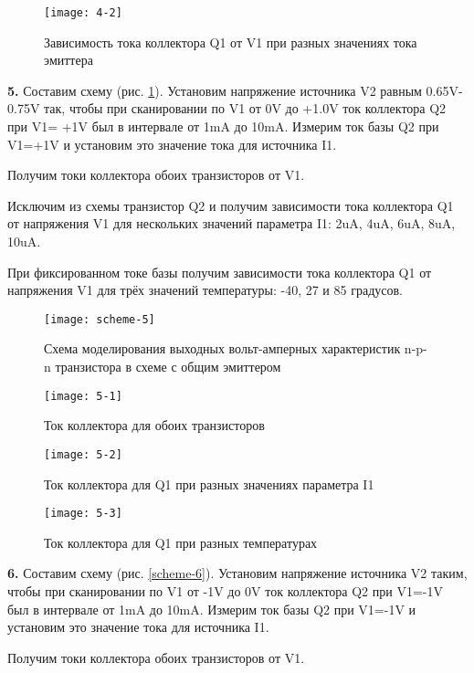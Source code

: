 \documentclass{semi}
\begin{document}
\begin{figure}[H]
	\centering
	\texttt{[image: 4-2]}
	\caption{Зависимость тока коллектора Q1 от V1 при разных значениях тока эмиттера}
\end{figure}

\textbf{{\normalsize 5.}}
Составим схему (рис. \ref{scheme-5}). Установим напряжение источника V2 равным 0.65V-0.75V так, чтобы при сканировании по V1 от 0V до +1.0V ток коллектора Q2 при V1= +1V был в интервале от 1mA до 10mA. Измерим ток базы Q2 при V1=+1V и установим это значение тока для источника I1.

Получим токи коллектора обоих транзисторов от V1.

Исключим из схемы транзистор Q2 и получим зависимости тока коллектора Q1 от напряжения V1 для нескольких значений параметра I1: 2uA, 4uA, 6uA, 8uA, 10uA.

При фиксированном токе базы получим зависимости тока коллектора Q1 от напряжения V1 для трёх значений температуры: -40, 27 и 85 градусов.

\begin{figure}[H]
	\centering
	\texttt{[image: scheme-5]}
	\caption{Схема моделирования выходных вольт-амперных характеристик n-p-n транзистора в схеме с общим эмиттером}
	\label{scheme-5}
\end{figure}

\begin{figure}[H]
	\centering
	\texttt{[image: 5-1]}
	\caption{Ток коллектора для обоих транзисторов}
\end{figure}

\begin{figure}[H]
	\centering
	\texttt{[image: 5-2]}
	\caption{Ток коллектора для Q1 при разных значениях параметра I1}
\end{figure}

\begin{figure}[H]
	\centering
	\texttt{[image: 5-3]}
	\caption{Ток коллектора для Q1 при разных температурах}
\end{figure}

\textbf{{\normalsize 6.}}
Составим схему (рис. \ref{scheme-6}). Установим напряжение источника V2 таким, чтобы при сканировании по V1 от -1V до 0V ток коллектора Q2 при V1=-1V был в интервале от 1mA до 10mA. Измерим ток базы Q2 при V1=-1V и установим это значение тока для источника I1.

Получим токи коллектора обоих транзисторов от V1.
\end{document}
